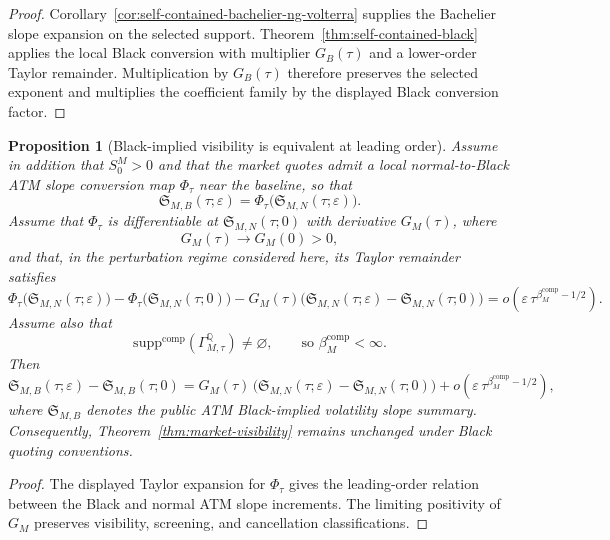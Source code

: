 \documentclass[11pt,a4paper]{amsart}
\theoremstyle{plain}
\newtheorem{proposition}[theorem]{Proposition}
\theoremstyle{definition}
\theoremstyle{remark}
\newcommand{\QQ}{\mathbb{Q}}
\begin{document}
\begin{proof}
Corollary~\ref{cor:self-contained-bachelier-ng-volterra} supplies the Bachelier slope expansion on
the selected support.  Theorem~\ref{thm:self-contained-black} applies the local Black conversion
with multiplier \(G_B(\tau)\) and a lower-order Taylor remainder.  Multiplication by \(G_B(\tau)\)
therefore preserves the selected exponent and multiplies the coefficient family by the displayed
Black conversion factor.
\end{proof}

\begin{proposition}[Black-implied visibility is equivalent at leading order]\label{prop:black}
Assume in addition that \(S_0^M>0\) and that the market quotes admit a local normal-to-Black ATM
slope conversion map \(\Phi_\tau\) near the baseline, so that
\[
        \mathfrak S_{M,B}(\tau;\varepsilon)
        =
        \Phi_\tau\bigl(\mathfrak S_{M,N}(\tau;\varepsilon)\bigr).
\]
Assume that \(\Phi_\tau\) is differentiable at
\(\mathfrak S_{M,N}(\tau;0)\) with derivative \(G_M(\tau)\), where
\[
        G_M(\tau)\to G_M(0)>0,
\]
and that, in the perturbation regime considered here, its Taylor remainder satisfies
\[
        \Phi_\tau\bigl(\mathfrak S_{M,N}(\tau;\varepsilon)\bigr)
        -
        \Phi_\tau\bigl(\mathfrak S_{M,N}(\tau;0)\bigr)
        -
        G_M(\tau)
        \bigl(
                \mathfrak S_{M,N}(\tau;\varepsilon)
                -
                \mathfrak S_{M,N}(\tau;0)
        \bigr)
        =
        o\!\left(\varepsilon\,\tau^{\beta_M^{\mathrm{comp}}-1/2}\right).
\]
Assume also that
\[
        \mathrm{supp}^{\mathrm{comp}}(\Gamma_{M,\tau}^\QQ)\neq\varnothing,
        \qquad
        \text{so }
        \beta_M^{\mathrm{comp}}<\infty.
\]
Then
\[
        \mathfrak S_{M,B}(\tau;\varepsilon)-\mathfrak S_{M,B}(\tau;0)
        =
        G_M(\tau)\,
        \bigl(
                \mathfrak S_{M,N}(\tau;\varepsilon)-\mathfrak S_{M,N}(\tau;0)
        \bigr)
        +
        o\!\left(\varepsilon\,\tau^{\beta_M^{\mathrm{comp}}-1/2}\right),
\]
where \(\mathfrak S_{M,B}\) denotes the public ATM Black-implied volatility slope summary.
Consequently,
Theorem~\ref{thm:market-visibility} remains unchanged under Black quoting conventions.
\end{proposition}

\begin{proof}
The displayed Taylor expansion for \(\Phi_\tau\) gives the leading-order relation between the
Black and normal ATM slope increments.  The limiting positivity of \(G_M\) preserves visibility,
screening, and cancellation classifications.
\end{proof}
\end{document}
